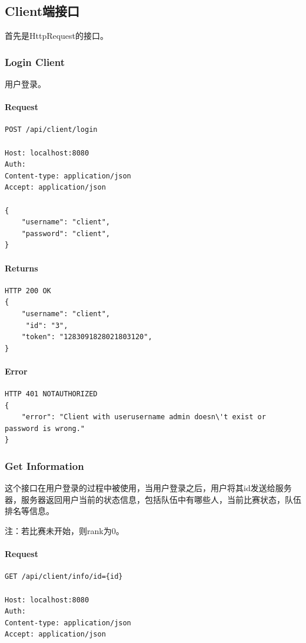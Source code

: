 \documentclass{article}
\begin{document}
\subsection{Client端接口}
首先是HttpRequest的接口。

\subsubsection{Login Client}
用户登录。

\paragraph*{Request}
\begin{lstlisting}
POST /api/client/login

Host: localhost:8080
Auth:
Content-type: application/json
Accept: application/json

{
    "username": "client",
    "password": "client",
}
\end{lstlisting}

\paragraph*{Returns}
\begin{lstlisting}
HTTP 200 OK
{
    "username": "client",
     "id": "3",
    "token": "1283091828021803120",
}

\end{lstlisting}

\paragraph*{Error}
\begin{lstlisting}
HTTP 401 NOTAUTHORIZED
{
    "error": "Client with userusername admin doesn\'t exist or password is wrong."
}
\end{lstlisting}

\subsubsection{Get Information}
这个接口在用户登录的过程中被使用，当用户登录之后，用户将其id发送给服务器，服务器返回用户当前的状态信息，包括队伍中有哪些人，当前比赛状态，队伍排名等信息。

注：若比赛未开始，则rank为0。

\paragraph*{Request}
\begin{lstlisting}
GET /api/client/info/id={id}

Host: localhost:8080
Auth:
Content-type: application/json
Accept: application/json
\end{lstlisting}
\end{document}
